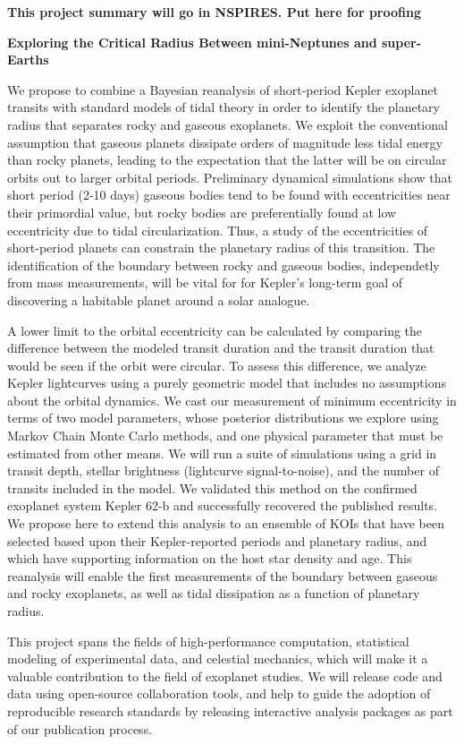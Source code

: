 \centerline{\bf This project summary will go in NSPIRES.  Put here for proofing} \medskip

\centerline{\bf Exploring the Critical Radius Between mini-Neptunes and super-Earths} \medskip

We propose to combine a Bayesian reanalysis of short-period Kepler
exoplanet transits with standard models of tidal theory in order to
identify the planetary radius that separates rocky and gaseous
exoplanets. We exploit the conventional assumption that gaseous
planets dissipate orders of magnitude less tidal energy than rocky
planets, leading to the expectation that the latter will be on
circular orbits out to larger orbital periods. Preliminary dynamical
simulations show that short period (2-10 days) gaseous bodies tend to
be found with eccentricities near their primordial value, but rocky
bodies are preferentially found at low eccentricity due to tidal
circularization.  Thus, a study of the eccentricities of short-period
planets can constrain the planetary radius of this transition.  The
identification of the boundary between rocky and gaseous bodies,
independetly from mass measurements, will be vital for for Kepler's
long-term goal of discovering a habitable planet around a solar
analogue.

A lower limit to the orbital eccentricity can be calculated by
comparing the difference between the modeled transit duration and the
transit duration that would be seen if the orbit were circular.  To
assess this difference, we analyze Kepler lightcurves using a purely
geometric model that includes no assumptions about the orbital
dynamics.  We cast our measurement of minimum eccentricity in terms of
two model parameters, whose posterior distributions we explore using
Markov Chain Monte Carlo methods, and one physical parameter that must
be estimated from other means.  We will run a suite of simulations
using a grid in transit depth, stellar brightness (lightcurve
signal-to-noise), and the number of transits included in the model.
%
%
We validated this method on the confirmed exoplanet system Kepler 62-b
and successfully recovered the published results. We propose here to
extend this analysis to an ensemble of KOIs that have been selected
based upon their Kepler-reported periods and planetary radius, and
which have supporting information on the host star density and age.
This reanalysis will enable the first measurements of the boundary
between gaseous and rocky exoplanets, as well as tidal dissipation as
a function of planetary radius.

This project spans the fields of high-performance computation,
statistical modeling of experimental data, and celestial mechanics,
which will make it a valuable contribution to the field of exoplanet
studies.  We will release code and data using open-source
collaboration tools, and help to guide the adoption of reproducible
research standards by releasing interactive analysis packages as part
of our publication process.

